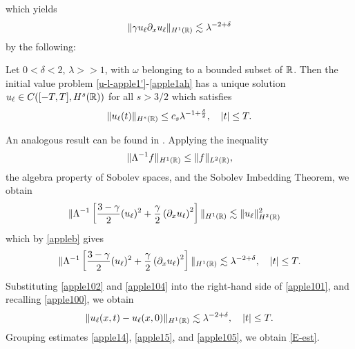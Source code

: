%
%
which yields 
%
%
\begin{equation}
\begin{split}
\|\gamma u_\ell \partial_x u_\ell \|_{H^1(\mathbb{R})} \lesssim \lambda^{-2 + \delta}
\label{apple102}
\end{split}
\end{equation}
%
%
%
%
by the following:
%
%
%
%
%
% 				
%
%
%
%
%
\begin{lemma}
\label{appleb}
Let $0<\delta<2$, $\lambda >>1$, with $\omega$ belonging to a bounded
subset of $\mathbb{R}$. Then the initial value problem
\eqref{u-l-apple1'}-\eqref{apple1ah}
has a unique solution
$u_\ell \in C( [-T,T], H^s(\mathbb{R}))$ for all $s
> 3/2$ which satisfies
%
%
\begin{equation}
\label{apple10'}
\|u_\ell(t)\|_{H^s(\mathbb{R})} \le c_s \lambda^{-1 +
\frac{\delta}{2}}, \quad |t| \le T.
\end{equation}
%
%
\end{lemma}
%
An analogous result can be found in \cite{Himonas:2009fk}. 
%
%
%
Applying the inequality %
%
\begin{equation*}
\begin{split}
\|\Lambda^{-1} f \|_{H^1(\mathbb{R})} \le \|f\|_{L^2(\mathbb{R})},
\label{apple27}
\end{split}
\end{equation*}
%
%
the algebra property of Sobolev spaces, and
the Sobolev Imbedding Theorem, we obtain
%
%
\begin{equation*}
\begin{split}
\|\Lambda^{-1} \left[ \frac{3-\gamma}{2}(u_\ell)^2 +
\frac{\gamma}{2}\left( \partial_x u_\ell \right)^2 \right] \|_{H^1(\mathbb{R})}
& \lesssim \|u_\ell\|_{H^2(\mathbb{R})}^2
\end{split}
\end{equation*}
%
%
which by \cref{appleb} gives
%
%
\begin{equation}
\begin{split}
\|\Lambda^{-1} \left[ \frac{3-\gamma}{2}(u_\ell)^2 +
\frac{\gamma}{2}\left( \partial_x u_\ell \right)^2 \right] \|_{H^1(\mathbb{R})}
\lesssim \lambda^{-2 + \delta}, \quad |t| \le T.
\label{apple104}
\end{split}
\end{equation}
%
%
Substituting \eqref{apple102} and \eqref{apple104} into the right-hand side 
of
\eqref{apple101}, and recalling \eqref{apple100}, we obtain
%
%
\begin{equation}
\begin{split}
\|u_\ell(x,t) - u_\ell(x,0)\|_{H^1(\mathbb{R})} \lesssim \lambda^{-2 + \delta}, 
\quad |t| \le T.
\label{apple105}
\end{split}
\end{equation}
%
%
Grouping estimates \eqref{apple14}, \eqref{apple15}, and \eqref{apple105}, 
we obtain \eqref{E-est}. \qquad \qedsymbol
%
%
%
%

